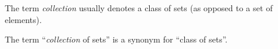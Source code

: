 \documentclass[12pt]{article}
\begin{document}
The term \emph{collection} usually denotes a class of sets (as opposed to a set of  elements).

The term ``\emph{collection} of sets'' is a synonym for ``class of sets''.
\end{document}
